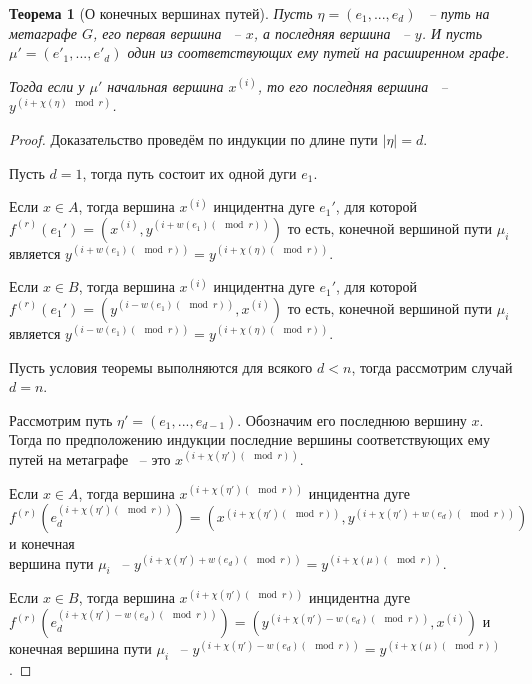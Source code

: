 \documentclass[14pt]{mmcs-article}
\newtheorem{theorem}{Теорема}
\begin{document}
\begin{theorem}[О конечных вершинах путей]

Пусть  $\eta = (e_1, ..., e_d)$ ~-- путь на метаграфе $G$, его первая вершина ~-- $x$, а последняя вершина ~-- $y$. И пусть $\mu' = (e'_1, ..., e'_d)$ один из соответствующих ему путей на расширенном графе.

Тогда если у $\mu'$ начальная вершина $x^{(i)}$, то его последняя вершина ~-- $y^{(i + \chi(\eta)\mod{r})}$.

\end{theorem}

\begin{proof}

Доказательство проведём по индукции по длине пути $|\eta| = d$.

Пусть $d = 1$, тогда путь состоит их одной дуги $e_1$.

Если $x \in A$, тогда вершина $x^{(i)}$ инцидентна дуге $e_1'$, для которой $f^{(r)}(e_1') = (x^{(i)}, y^{(i + w(e_1) (\mod{r}))})$ то есть, конечной вершиной пути $\mu_i$ является $y^{(i + w(e_1) (\mod{r}))} = y^{(i + \chi(\eta) (\mod{r}))}$.

Если $x \in B$, тогда вершина $x^{(i)}$ инцидентна дуге $e_1'$, для которой $f^{(r)}(e_1') = (y^{(i - w(e_1) (\mod{r}))}, x^{(i)})$ то есть, конечной вершиной пути $\mu_i$ является $y^{(i - w(e_1) (\mod{r}))} = y^{(i + \chi(\eta) (\mod{r}))}$.

Пусть условия теоремы выполняются для всякого $d < n$, тогда рассмотрим случай $d = n$.

Рассмотрим путь $\eta' = (e_1, ..., e_{d - 1})$. Обозначим его последнюю вершину $x$. Тогда по предположению индукции последние вершины соответствующих ему путей на метаграфе ~-- это $x^{(i + \chi(\eta')(\mod{r}))}$.

Если $x \in A$, тогда вершина $x^{(i + \chi(\eta')(\mod{r}))}$ инцидентна дуге \\ $f^{(r)}(e_d^{(i + \chi(\eta')(\mod{r}))}) = (x^{(i + \chi(\eta')(\mod{r}))}, y^{(i + \chi(\eta') + w(e_d) (\mod{r}))})$ и конечная \\ вершина пути $\mu_i$ ~-- $y^{(i + \chi(\eta') + w(e_d) (\mod{r}))} = y^{(i + \chi(\mu) (\mod{r}))}$.

Если $x \in B$, тогда вершина $x^{(i + \chi(\eta')(\mod{r}))}$ инцидентна дуге \\ $f^{(r)}(e_d^{(i + \chi(\eta') - w(e_d) (\mod{r}))}) = (y^{(i + \chi(\eta') - w(e_d) (\mod{r}))}, x^{(i)})$ и конечная вершина пути $\mu_i$ ~-- $y^{(i + \chi(\eta') - w(e_d) (\mod{r}))} = y^{(i + \chi(\mu) (\mod{r}))}$.

\end{proof}
\end{document}
